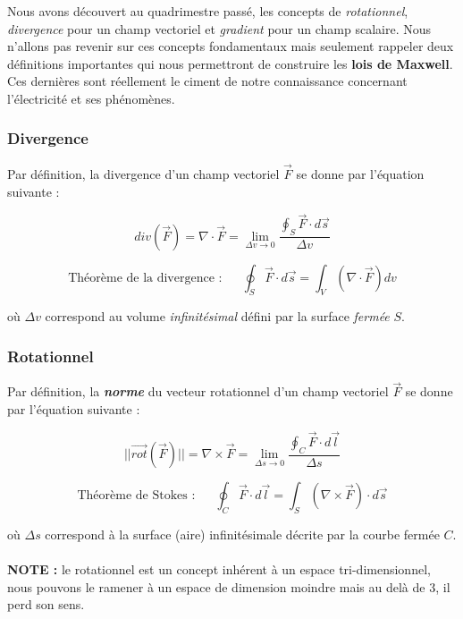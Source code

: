 \documentclass[a4paper,12pt]{article}
\begin{document}
Nous avons découvert au quadrimestre passé, les concepts de \textit{rotationnel}, \textit{divergence} pour un champ vectoriel et \textit{gradient} pour un champ scalaire.
Nous n'allons pas revenir sur ces concepts fondamentaux mais seulement rappeler deux définitions importantes qui nous permettront de construire les \textbf{lois de Maxwell}. 
Ces dernières sont réellement le ciment de notre connaissance concernant l'électricité et ses phénomènes. \\ 

\subsubsection{Divergence} 

Par définition, la divergence d'un champ vectoriel $\vec{F}$ se donne par l'équation suivante : 

\[ div(\vec{F}) = \nabla \cdot \vec{F} = \lim_{\Delta v \to 0} \frac{\oint_{S} \vec{F} \cdot d\vec{s}}{\Delta v} \]

\[\mbox{Théorème de la divergence : } \hspace{15pt} \oint_{S} \vec{F} \cdot d\vec{s} = \int_{V} (\nabla \cdot \vec{F}) dv\]

où $\Delta v$ correspond au volume \textit{infinitésimal} défini par la surface \textit{fermée} $S$.



\subsubsection{Rotationnel} 

Par définition, la \textit{\textbf{norme}} du vecteur rotationnel d'un champ vectoriel $\vec{F}$ se donne par l'équation suivante : 

\[ || \vec{rot}(\vec{F}) ||  = \nabla \times \vec{F} = \lim_{\Delta s \to 0} \frac{\oint_{C} \vec{F} \cdot d\vec{l} }{\Delta s}\]

\[\mbox{Théorème de Stokes : } \hspace{15pt} \oint_{C} \vec{F} \cdot d\vec{l} = \int_{S} (\nabla \times \vec{F}) \cdot d\vec{s}\]

où $\Delta s$ correspond à la surface (aire) infinitésimale décrite par la courbe fermée $C$. \\ \\
\textbf{NOTE : } le rotationnel est un concept inhérent à un espace tri-dimensionnel, nous pouvons le ramener à un espace de dimension moindre 
mais au delà de 3, il perd son sens.
\end{document}
